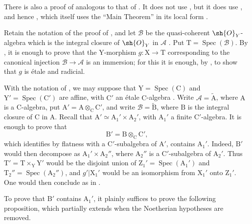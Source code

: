 \begin{remark}[18.12.14]
\label{IV.18.12.14}
There is also a proof of  analogous to that of . It does not use , but it does use , and hence , which itself uses the ``Main Theorem'' in its local form .

Retain the notation of the proof of , and let $\mathscr{B}$ be the quasi-coherent $\sh{O}_Y$-algebra which is the integral closure of $\sh{O}_Y$ in $\mathscr{A}$ . Put $\mathrm{T}=\operatorname{Spec}(\mathscr{B})$. By , it is enough to prove that the $\mathrm{Y}$-morphism $g:\mathrm{X}\to\mathrm{T}$ corresponding to the canonical injection $\mathscr{B}\to\mathscr{A}$ is an immersion; for this it is enough, by , to show that $g$ is \'etale and radicial.

With the notation of , we may suppose that $\mathrm{Y}=\operatorname{Spec}(\mathrm{C})$ and $\mathrm{Y}'=\operatorname{Spec}(\mathrm{C}')$ are affine, with $\mathrm{C}'$ an \'etale $\mathrm{C}$-algebra . Write $\mathscr{A}=\widetilde{\mathrm{A}}$, where $\mathrm{A}$ is a $\mathrm{C}$-algebra, put $\mathrm{A}'=\mathrm{A}\otimes_\mathrm{C}\mathrm{C}'$, and write $\mathscr{B}=\widetilde{\mathrm{B}}$, where $\mathrm{B}$ is the integral closure of $\mathrm{C}$ in $\mathrm{A}$. Recall that $\mathrm{A}'\simeq\mathrm{A}_1'\times\mathrm{A}_2'$, with $\mathrm{A}_1'$ a finite $\mathrm{C}'$-algebra. It is enough to prove that
\[
  \mathrm{B}'=\mathrm{B}\otimes_\mathrm{C}\mathrm{C}',
\]
which identifies by flatness with a $\mathrm{C}'$-subalgebra of $\mathrm{A}'$, contains $\mathrm{A}_1'$. Indeed, $\mathrm{B}'$ would then decompose as $\mathrm{A}_1'\times\mathrm{A}_2''$, where $\mathrm{A}_2''$ is a $\mathrm{C}'$-subalgebra of $\mathrm{A}_2'$. Thus $\mathrm{T}'=\mathrm{T}\times_\mathrm{Y}\mathrm{Y}'$ would be the disjoint union of $\mathrm{Z}_1'=\operatorname{Spec}(\mathrm{A}_1')$ and $\mathrm{T}_2''=\operatorname{Spec}(\mathrm{A}_2'')$, and $g'|\mathrm{X}_1'$ would be an isomorphism from $\mathrm{X}_1'$ onto $\mathrm{Z}_1'$. One would then conclude as in .

To prove that $\mathrm{B}'$ contains $\mathrm{A}_1'$, it plainly suffices to prove the following proposition, which partially extends  when the Noetherian hypotheses are removed.
\end{remark}

